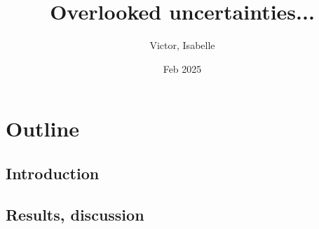 \documentclass[11pt,letter]{article}
\title{Overlooked uncertainties...}
\author{Victor, Isabelle}
\date{Feb 2025}
\begin{document}
\maketitle

\section*{Outline}

\subsection*{Introduction}


\subsection*{Results, discussion}
\end{document}
